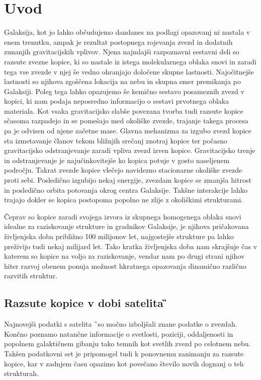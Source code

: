 
\section{Uvod}
\label{sec:slo_uvod}
Galaksija, kot jo lahko občudujemo dandanes na podlagi opazovanj ni nastala v enem trenutku, ampak je rezultat postopnega rojevanja zvezd in dodatnih zunanjih gravitacijskih vplivov. Njena najmlajši razpoznavni sestavni deli so razsute zvezne kopice, ki so nastale iz istega molekularnega oblaka snovi in zaradi tega vse zvezde v njej še vedno ohranjajo določene skupne lastnosti. Najočitnejše lastnosti so njihova zgoščena lokacija na nebu in skupna smer premikanja po Galaksiji. Poleg tega lahko opazujemo še kemično sestavo posameznih zvezd v kopici, ki nam podaja neposredno informacijo o sestavi prvotnega oblaka materiala. Kot vsaka gravitacijsko slabše povezana tvorba tudi razsute kopice sčasoma razpadejo in se pomešajo med okoliške zvezde, trajanje takega procesa pa je odvisen od njene začetne mase. Glavna mehanizma za izgubo zvezd kopice sta izmetavanje članov tekom bližnjih srečanj znotraj kopice ter počasno gravitacijsko odstranjevanje zaradi vpliva zvezd izven kopice. Gravitacijsko trenje in odstranjevanje je najučinkovitejše ko kopica potuje v gosto naseljenem področju. Takrat zvezde kopice vlečejo navidezno stacionarne okoliške zvezde proti sebi. Posledično izgubijo nekaj energije, zvezdam kopice se zmanjša hitrost in posledično orbita potovanja okrog centra Galaksije. Takšne interakcije lahko trajajo dokler se kopica postopoma popolno ne zlije z okoliškimi strukturami.

Čeprav so kopice zaradi svojega izvora iz skupnega homogenega oblaka snovi idealne za raziskovanje strukture in gradnikov Galaksije, je njihova pričakovana življenjska doba približno 100 milijonov let, najgostejše strukture pa lahko preživijo tudi nekaj milijard let. Tako kratka življenjska doba nam skrajšuje čas v katerem so kopice na voljo za raziskovanje, vendar nam po drugi strani njihov hiter razvoj obenem ponuja možnost hkratnega opazovanja dinamično različno razvitih struktur.

\subsection{Razsute kopice v dobi satelita \G}
Najnovejši podatki s satelita \G\ so močno izboljšali znane podatke o zvezdah. Končno poznamo natančne informacije o svetlosti, poziciji, oddaljenosti in popolnem galaktičnem gibanju tako temnih kot svetlih zvezd po celotnem nebu. Takšen podatkovni set je pripomogel tudi k ponovnemu zanimanju za razsute kopice, kar v zadnjem času opazimo kot povečano število novih dognanj o teh strukturah.

